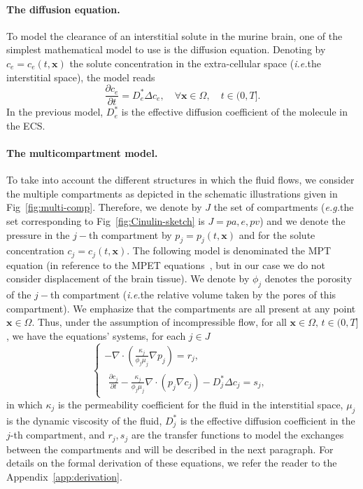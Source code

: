 \documentclass[10pt,letterpaper]{article}
\newcommand{\ie}{\emph{i.e.}\;}
\newcommand{\eg}{\emph{e.g.}\;}
\newcommand{\1}{^{(1)}}
\newcommand{\2}{^{(2)}}
\renewcommand{\div}{\nabla\cdot}
\newcommand{\Lap}{\Delta}
\newcommand {\f}   {\frac}
\newcommand {\p}   {\partial}
\newcommand {\x}   {\mathbf{x}}
\begin{document}
\paragraph{The diffusion equation.}
To model the clearance of an interstitial solute in the murine brain, one of the simplest mathematical model to use is the diffusion equation. Denoting by $c_e = c_e(t,\x)$ the solute concentration in the extra-cellular space (\ie the interstitial space), the model reads
\begin{equation}
    \f{\p c_e}{\p t} = D_e^* \Delta c_e , \quad \forall \x\in \Omega,\quad t\in (0,T].
    \label{eq:diffusion-convection}
\end{equation}
In the previous model, $D_e^*$ is the effective diffusion coefficient of the molecule in the ECS.


\paragraph{The multicompartment model.}
To take into account the different structures in which the fluid flows, we consider the multiple compartments as depicted in the schematic illustrations given in Fig~\ref{fig:multi-comp}. Therefore, we denote by $J$ the set of compartments (\eg the set corresponding to Fig~\ref{fig:Cinulin-sketch} is $J={pa,e,pv}$) and we denote the pressure in the $j-$th compartment by $p_j = p_j(t,\x)$ and for the solute concentration $c_j = c_j(t,\x)$. 
The following model is denominated the MPT equation (in reference to the MPET equations~\cite{Bai_1993_Multiporosity, tully_ventikos_2011}, but in our case we do not consider displacement of the brain tissue).
We denote by $\phi_j$ denotes the porosity of the $j-$th compartment (\ie the relative volume taken by the pores of this compartment).
We emphasize that the compartments are all present at any point $\x\in \Omega$. Thus, under the assumption of incompressible flow, for all $\x\in \Omega,\, t\in (0,T]$, we have the equations' systems, for each $j\in J$
\begin{equation}
    \begin{cases}
         -  \nabla\cdot( \frac{\kappa_j}{\phi_j \mu_j} \nabla p_j) = r_j,\\ %
          \begin{multlined} \frac{\partial c_j}{\partial t} - \frac{ \kappa_j}{\phi_j \mu_j}\div\left( p_j  \nabla c_j\right)  - D_j^* \Lap c_j 
         = s_j,
         \end{multlined}
    \end{cases}
    \label{eq:main-system}
\end{equation}
in which $\kappa_j$ is the permeability coefficient for the fluid in the interstitial space, $\mu_j$ is the dynamic viscosity of the fluid, $D_j^*$ is the effective diffusion coefficient in the $j$-th compartment, and $r_{j}, s_{j}$ are the transfer functions to model the exchanges between the compartments and will be described in the next paragraph. For details on the formal derivation of these equations, we refer the reader to the Appendix~\ref{app:derivation}. 
\end{document}
